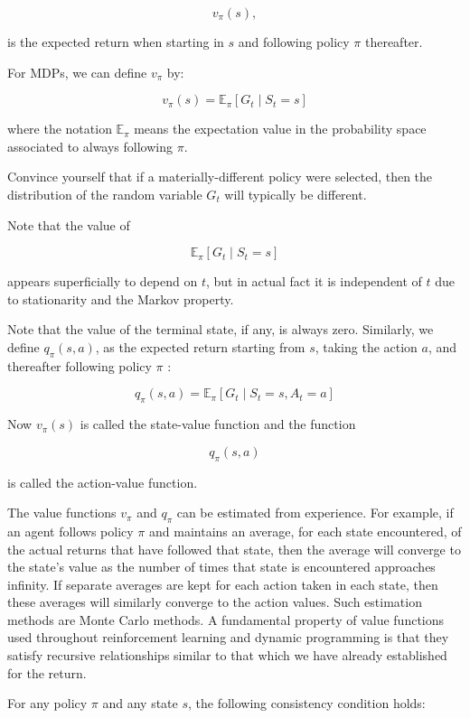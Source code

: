 \documentclass[11pt]{article}
\theoremstyle{plain} %
\theoremstyle{remark}
\begin{document}
$$
  v_{\pi}(s),
$$

is the expected return when starting in $s$ and following policy $\pi$
thereafter.

For MDPs, we can define $v_{\pi}$ by:

$$
  v_{\pi}(s)=\mathbb{E}_{\pi}\left[G_{t} \mid S_{t}=s\right]
$$

where the notation $\mathbb{E}_{\pi}$ means the expectation value in the
probability space associated to always following $\pi$.

Convince yourself that if a materially-different policy were selected,
then the distribution of the random variable $G_{t}$ will typically be
different.

Note that the value of

$$
  \mathbb{E}_{\pi}\left[G_{t} \mid S_{t}=s\right]
$$

appears superficially to depend on $t$, but in actual fact it is independent of
$t$ due to stationarity and the Markov property.

Note that the value of the terminal state, if any, is always zero. Similarly, we define $q_{\pi}(s, a)$, as the expected return starting
from $s$, taking the action $a$, and thereafter following policy $\pi$ :

$$
  q_{\pi}(s, a)=\mathbb{E}_{\pi}\left[G_{t} \mid S_{t}=s, A_{t}=a\right]
$$

Now $v_{\pi}(s)$ is called the state-value function and the function

$$
  q_{\pi}(s, a)
$$

is called the action-value function.

The value functions $v_{\pi}$ and $q_{\pi}$ can be estimated from
experience. For example, if an agent follows policy $\pi$ and maintains an average,
for each state encountered, of the actual returns that have followed that
state, then the average will converge to the state's value as the number of
times that state is encountered approaches infinity. If separate averages are kept for each action taken in each state, then
these averages will similarly converge to the action values. Such estimation methods are Monte Carlo methods. A fundamental property of value functions used throughout reinforcement
learning and dynamic programming is that they satisfy recursive relationships
similar to that which we have already established for the return.

For any policy $\pi$ and any state $s$, the following consistency
condition holds:
\end{document}
